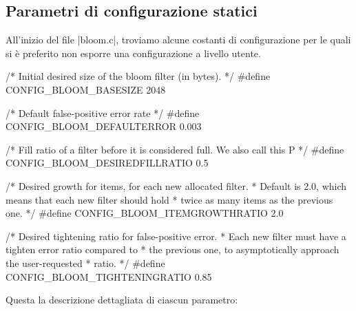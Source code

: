\subsection{Parametri di configurazione statici}
\label{sec:patch:staticparms}

All'inizio del file \cverb|bloom.c|, troviamo alcune costanti di configurazione per le quali si è
preferito non esporre una configurazione a livello utente.

\begin{commentedsource}[style=csource,caption=Parametri statici]
/* Initial desired size of the bloom filter (in bytes). */
#define CONFIG_BLOOM_BASESIZE 2048 

/* Default false-positive error rate */
#define CONFIG_BLOOM_DEFAULTERROR 0.003

/* Fill ratio of a filter before it is considered full. We also call this P */
#define CONFIG_BLOOM_DESIREDFILLRATIO 0.5

/* Desired growth for items, for each new allocated filter.
 * Default is 2.0, which means that each new filter should hold
 * twice as many items as the previous one. */
#define CONFIG_BLOOM_ITEMGROWTHRATIO 2.0

/* Desired tightening ratio for false-positive error.
 * Each new filter must have a tighten error ratio compared to
 * the previous one, to asymptotically approach the user-requested
 * ratio. */
#define CONFIG_BLOOM_TIGHTENINGRATIO 0.85
\end{commentedsource}

Questa la descrizione dettagliata di ciascun parametro:


